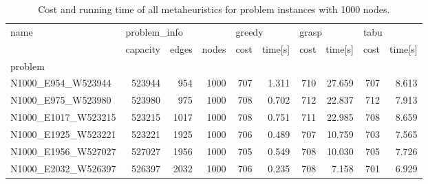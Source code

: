 \begin{landscape}

\begin{table}
\centering
\begin{tabular}{lrrrrrrrrr}
\toprule
name & \multicolumn{3}{l}{problem\_info} & \multicolumn{2}{l}{greedy} & \multicolumn{2}{l}{grasp} & \multicolumn{2}{l}{tabu} \\
{} &     capacity & edges & nodes &   cost & time[s] &  cost & time[s] & cost & time[s] \\
problem             &              &       &       &        &         &       &         &      &         \\
\midrule
N1000\_E954\_W523944  &       523944 &   954 &  1000 &    707 &   1.311 &   710 &  27.659 &  707 &   8.613 \\
N1000\_E975\_W523980  &       523980 &   975 &  1000 &    708 &   0.702 &   712 &  22.837 &  712 &   7.913 \\
N1000\_E1017\_W523215 &       523215 &  1017 &  1000 &    708 &   0.751 &   711 &  22.985 &  708 &   8.659 \\
N1000\_E1925\_W523221 &       523221 &  1925 &  1000 &    706 &   0.489 &   707 &  10.759 &  703 &   7.565 \\
N1000\_E1956\_W527027 &       527027 &  1956 &  1000 &    705 &   0.549 &   708 &  10.030 &  705 &   7.726 \\
N1000\_E2032\_W526397 &       526397 &  2032 &  1000 &    706 &   0.235 &   708 &   7.158 &  701 &   6.929 \\
\bottomrule
\end{tabular}
\caption{Cost and running time of all metaheuristics for problem instances with 1000 nodes.}
\label{table:1000-results}
\end{table}

\end{landscape}
